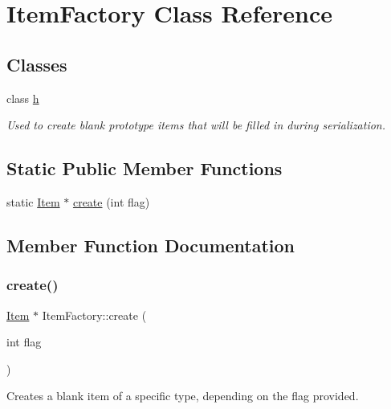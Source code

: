 \hypertarget{class_item_factory}{}\section{Item\+Factory Class Reference}
\label{class_item_factory}
\subsection*{Classes}
\begin{DoxyCompactItemize}
\item 
class \hyperlink{class_item_factory_1_1h}{h}
\begin{DoxyCompactList}\small\item\em Used to create blank prototype items that will be filled in during serialization. \end{DoxyCompactList}\end{DoxyCompactItemize}
\subsection*{Static Public Member Functions}
\begin{DoxyCompactItemize}
\item 
static \hyperlink{class_item}{Item} $\ast$ \hyperlink{class_item_factory_a97812df3aa81f4bc31c0150b5dc0bd11}{create} (int flag)
\end{DoxyCompactItemize}


\subsection{Member Function Documentation}
\hypertarget{class_item_factory_a97812df3aa81f4bc31c0150b5dc0bd11}{}\label{class_item_factory_a97812df3aa81f4bc31c0150b5dc0bd11} 
\subsubsection{\texorpdfstring{create()}{create()}}
{\footnotesize\ttfamily \hyperlink{class_item}{Item} $\ast$ Item\+Factory\+::create (\begin{DoxyParamCaption}\item[{int}]{flag }\end{DoxyParamCaption})\hspace{0.3cm}{\ttfamily [static]}}

Creates a blank item of a specific type, depending on the flag provided. 

